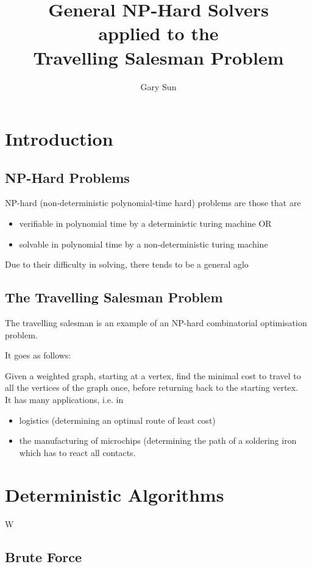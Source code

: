 \documentclass{article}
\title{
    General NP-Hard Solvers \\
    \large applied to the \\
    Travelling Salesman Problem
}
\author{Gary Sun}
\date{}
\begin{document}
\maketitle

\section{Introduction}
\subsection{NP-Hard Problems}
NP-hard (non-deterministic polynomial-time hard) problems are those that are 
\begin{itemize}
    \item verifiable in polynomial time by a deterministic turing machine OR
    \item solvable in polynomial time by a non-deterministic turing machine
\end{itemize}

Due to their difficulty in solving, there tends to be a general aglo

\subsection{The Travelling Salesman Problem}
The travelling salesman is an example of an NP-hard combinatorial optimisation problem.

It goes as follows:

Given a weighted graph, starting at a vertex, find the minimal cost to travel to all the vertices of the graph once, before returning back to the starting vertex. \\

It has many applications, i.e. in

\begin{itemize}
    \item logistics (determining an optimal route of least cost)
    \item the manufacturing of microchips (determining the path of a soldering iron which has to react all contacts.
\end{itemize}

\section{Deterministic Algorithms}

W

\subsection{Brute Force}
\end{document}
